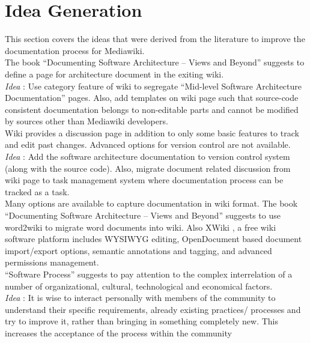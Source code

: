 \section{Idea Generation}
\indent This section covers the ideas that were derived from the literature to improve the documentation process for Mediawiki.
\\\indent The book \enquote{Documenting Software Architecture – Views and Beyond} \cite{BachmannDocumentingSoftware2010} suggests to define a page for architecture document in the exiting wiki.
\\\indent \emph{Idea} : Use category feature of wiki to segregate \enquote{Mid-level Software Architecture Documentation} pages. Also, add templates on wiki page such that source-code consistent documentation belongs to non-editable parts and cannot be modified by sources other than Mediawiki developers.
\newline
\\\indent Wiki provides a discussion page in addition to only some basic features to track and edit past changes. Advanced options for version control are not available.
\\\indent \emph{Idea} : Add the software architecture documentation to version control system (along with the source code). Also, migrate document related discussion from wiki page to task management system where documentation process can be tracked as a task.
\\\indent Many options are available to capture documentation in wiki format. The book \enquote{Documenting Software Architecture – Views and Beyond} \cite{BachmannDocumentingSoftware2010} suggests to use word2wiki to migrate word documents into wiki. Also XWiki \cite{Xwiki_Massol_2014}, a free wiki software platform includes WYSIWYG editing, OpenDocument based document import/export options, semantic annotations and tagging, and advanced permissions management.
\newline
\\\indent \enquote{Software Process} \cite{Fuggeffa1988} suggests to pay attention to the complex interrelation of a number of organizational, cultural, technological and economical factors.
\\\indent \emph{Idea} : It is wise to interact personally with members of the community to understand their specific requirements, already existing practices/ processes and try to improve it, rather than bringing in something completely new. This increases the acceptance of the process within the community
\newline
